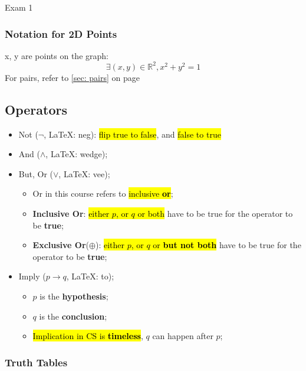 \documentclass{note}
\begin{document}
\begin{note}{Exam 1}
        \subsubsection{ Notation for 2D Points}
        x, y are points on the graph:
        \begin{displaymath}
            \exists (x, y) \in \mathbb{R}^{2}, x^{2} + y^{2} = 1
        \end{displaymath}
        For pairs, refer to \ref{sec: pairs} on page \pageref{sec: pairs}

        \subsection{Operators}

        \begin{itemize}
            \item Not ($ \neg $, LaTeX: neg): \hl{flip true to false}, and \hl{false to true}
            \item And ($ \wedge $, LaTeX: wedge);
            \item But, Or ($ \vee $, LaTeX: vee);
            \begin{itemize}
                \item Or in this course refers to \hl{inclusive \textbf{or}};
                \item \textbf{Inclusive Or}: \hl{either $ p $, or $ q $ or both} have to be true for the operator to be \textbf{true};
                \item \textbf{Exclusive Or}($ \oplus $): \hl{either $ p $, or $ q $ or \textbf{but not both}} have to be true for the operator to be \textbf{true};
            \end{itemize}
            \item Imply ($ p \to  q $, LaTeX: to);
            \begin{itemize}
                \item $ p $ is the \textbf{hypothesis};
                \item $ q $ is the \textbf{conclusion};
                \item \hl{Implication in CS is \textbf{timeless}}, $ q $ can happen after $ p $;
            \end{itemize}
        \end{itemize}

        \subsubsection{Truth Tables}


\end{note}
\end{document}
